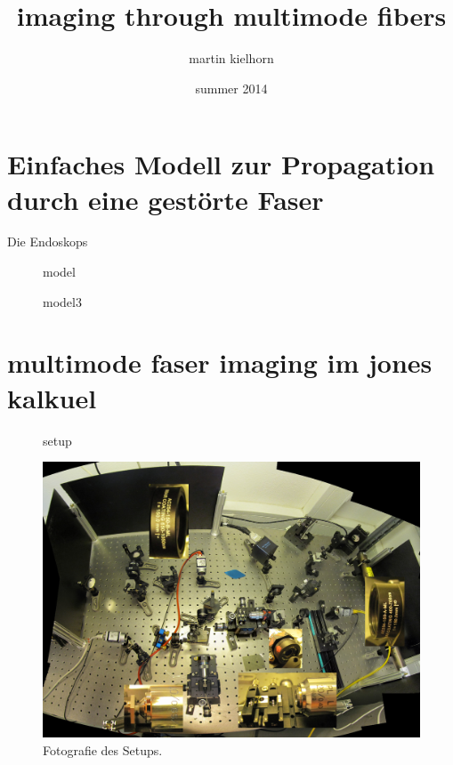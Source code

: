 \documentclass{article}
\author{martin kielhorn}
\title{imaging through multimode fibers}
\date{summer 2014}
\begin{document}
\maketitle

\section{Einfaches Modell zur Propagation durch eine gest\"orte Faser}
Die  Endoskops 

\begin{figure}[htbp]
  \centering
  
  \caption{model}
  \label{fig:model}
\end{figure}


\begin{figure}[htbp]
  \centering
  
  \caption{model3}
  \label{fig:model3}
\end{figure}


\section{multimode faser imaging im jones kalkuel}

\begin{figure}[htbp]
  \centering
  
  \caption{setup}
  \label{fig:setup}
\end{figure}



\begin{figure}[htbp]
  \centering
  \includegraphics[width=12cm]{../multi-mode-imaging.jpg}
  \caption{Fotografie des Setups. }
  \label{fig:e40}
\end{figure}
\end{document}
